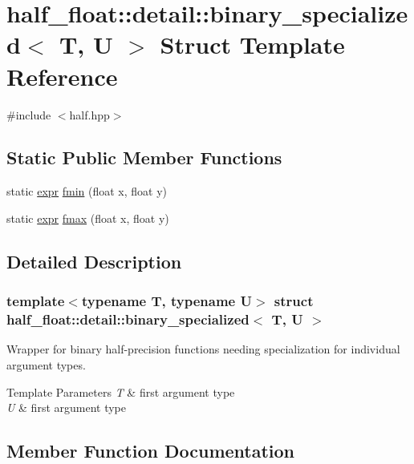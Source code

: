 \hypertarget{structhalf__float_1_1detail_1_1binary__specialized}{}\section{half\+\_\+float\+:\+:detail\+:\+:binary\+\_\+specialized$<$ T, U $>$ Struct Template Reference}
\label{structhalf__float_1_1detail_1_1binary__specialized}


{\ttfamily \#include $<$half.\+hpp$>$}

\subsection*{Static Public Member Functions}
\begin{DoxyCompactItemize}
\item 
static \hyperlink{structhalf__float_1_1detail_1_1expr}{expr} \hyperlink{structhalf__float_1_1detail_1_1binary__specialized_afb9ec4bebd2df86f570d20a6e7c6392f}{fmin} (float x, float y)
\item 
static \hyperlink{structhalf__float_1_1detail_1_1expr}{expr} \hyperlink{structhalf__float_1_1detail_1_1binary__specialized_a3d46871722c0a117f1921cc11bf47a89}{fmax} (float x, float y)
\end{DoxyCompactItemize}


\subsection{Detailed Description}
\subsubsection*{template$<$typename T, typename U$>$\newline
struct half\+\_\+float\+::detail\+::binary\+\_\+specialized$<$ T, U $>$}

Wrapper for binary half-\/precision functions needing specialization for individual argument types. 
\begin{DoxyTemplParams}{Template Parameters}
{\em T} & first argument type \\
\hline
{\em U} & first argument type \\
\hline
\end{DoxyTemplParams}


\subsection{Member Function Documentation}
\mbox{\label{structhalf__float_1_1detail_1_1binary__specialized_a3d46871722c0a117f1921cc11bf47a89}} 
